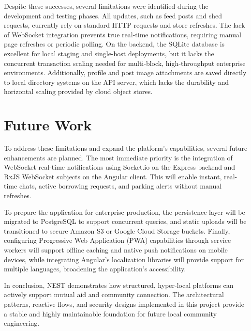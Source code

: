 Despite these successes, several limitations were identified during the development and testing phases. All updates, such as feed posts and shed requests, currently rely on standard HTTP requests and store refreshes. The lack of WebSocket integration prevents true real-time notifications, requiring manual page refreshes or periodic polling. On the backend, the SQLite database is excellent for local staging and single-host deployments, but it lacks the concurrent transaction scaling needed for multi-block, high-throughput enterprise environments. Additionally, profile and post image attachments are saved directly to local directory systems on the API server, which lacks the durability and horizontal scaling provided by cloud object stores.

\section{Future Work}

To address these limitations and expand the platform's capabilities, several future enhancements are planned. The most immediate priority is the integration of WebSocket real-time notifications using Socket.io on the Express backend and RxJS WebSocket subjects on the Angular client. This will enable instant, real-time chats, active borrowing requests, and parking alerts without manual refreshes.

To prepare the application for enterprise production, the persistence layer will be migrated to PostgreSQL to support concurrent queries, and static uploads will be transitioned to secure Amazon S3 or Google Cloud Storage buckets. Finally, configuring Progressive Web Application (PWA) capabilities through service workers will support offline caching and native push notifications on mobile devices, while integrating Angular's localization libraries will provide support for multiple languages, broadening the application's accessibility.

In conclusion, NEST demonstrates how structured, hyper-local platforms can actively support mutual aid and community connection. The architectural patterns, reactive flows, and security designs implemented in this project provide a stable and highly maintainable foundation for future local community engineering.

